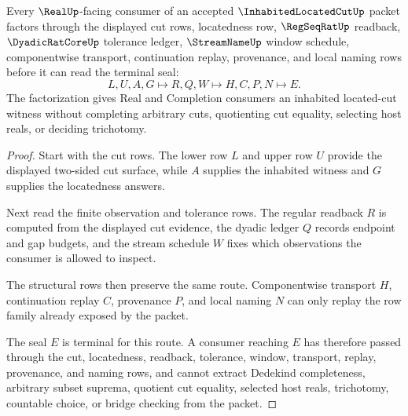 \begin{theorem}
\label{thm:inhabited-located-cut-real-seal-boundary}
Every $\RealUp$-facing consumer of an accepted $\InhabitedLocatedCutUp$ packet factors through the displayed cut rows, locatedness row, $\RegSeqRatUp$ readback, $\DyadicRatCoreUp$ tolerance ledger, $\StreamNameUp$ window schedule, componentwise transport, continuation replay, provenance, and local naming rows before it can read the terminal seal:
$$
L,U,A,G \longmapsto R,Q,W \longmapsto H,C,P,N \longmapsto E .
$$
The factorization gives Real and Completion consumers an inhabited located-cut witness without completing arbitrary cuts, quotienting cut equality, selecting host reals, or deciding trichotomy.
\end{theorem}
\begin{proof}
Start with the cut rows. The lower row $L$ and upper row $U$ provide the displayed two-sided cut surface, while $A$ supplies the inhabited witness and $G$ supplies the locatedness answers.

Next read the finite observation and tolerance rows. The regular readback $R$ is computed from the displayed cut evidence, the dyadic ledger $Q$ records endpoint and gap budgets, and the stream schedule $W$ fixes which observations the consumer is allowed to inspect.

The structural rows then preserve the same route. Componentwise transport $H$, continuation replay $C$, provenance $P$, and local naming $N$ can only replay the row family already exposed by the packet.

The seal $E$ is terminal for this route. A consumer reaching $E$ has therefore passed through the cut, locatedness, readback, tolerance, window, transport, replay, provenance, and naming rows, and cannot extract Dedekind completeness, arbitrary subset suprema, quotient cut equality, selected host reals, trichotomy, countable choice, or bridge checking from the packet.
\end{proof}



